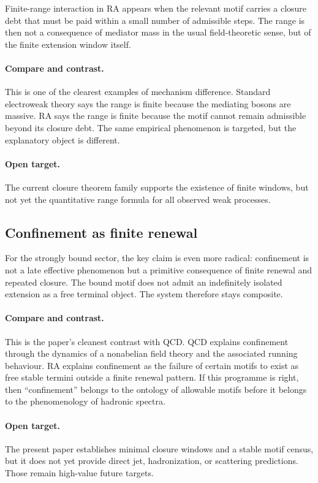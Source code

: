 \documentclass[11pt]{article}
\begin{document}
Finite-range interaction in RA appears when the relevant motif carries a closure debt that must be paid within a small number of admissible steps. The range is then not a consequence of mediator mass in the usual field-theoretic sense, but of the finite extension window itself.

\paragraph{Compare and contrast.} This is one of the clearest examples of mechanism difference. Standard electroweak theory says the range is finite because the mediating bosons are massive. RA says the range is finite because the motif cannot remain admissible beyond its closure debt. The same empirical phenomenon is targeted, but the explanatory object is different.

\paragraph{Open target.} The current closure theorem family supports the existence of finite windows, but not yet the quantitative range formula for all observed weak processes.

\subsection{Confinement as finite renewal}

For the strongly bound sector, the key claim is even more radical: confinement is not a late effective phenomenon but a primitive consequence of finite renewal and repeated closure. The bound motif does not admit an indefinitely isolated extension as a free terminal object. The system therefore stays composite.

\paragraph{Compare and contrast.} This is the paper's cleanest contrast with QCD. QCD explains confinement through the dynamics of a nonabelian field theory and the associated running behaviour. RA explains confinement as the failure of certain motifs to exist as free stable termini outside a finite renewal pattern. If this programme is right, then ``confinement'' belongs to the ontology of allowable motifs before it belongs to the phenomenology of hadronic spectra.

\paragraph{Open target.} The present paper establishes minimal closure windows and a stable motif census, but it does not yet provide direct jet, hadronization, or scattering predictions. Those remain high-value future targets.
\end{document}
